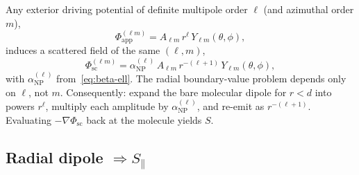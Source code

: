 \documentclass[11pt,a4paper]{article}
\theoremstyle{definition}
\newcommand{\alphanp}{\alpha_{\text{NP}}}
\begin{document}
\noindent
Any exterior driving potential of definite multipole order $\ell$ (and azimuthal order $m$),
\begin{equation}
  \Phi_{\mathrm{app}}^{(\ell m)}
  =
  A_{\ell m}\, r^{\ell}\, Y_{\ell m}(\theta,\phi),
\end{equation}
induces a scattered field of the same $(\ell,m)$,
\begin{equation}
  \Phi_{\mathrm{sc}}^{(\ell m)}
  =
  \alphanp^{(\ell)}\, A_{\ell m}\, r^{-(\ell+1)}\, Y_{\ell m}(\theta,\phi),
  \label{eq:sphere-multipole-response}
\end{equation}
with $\alphanp^{(\ell)}$ from~\eqref{eq:beta-ell}. The radial boundary-value problem depends only on $\ell$, not $m$. Consequently: expand the bare molecular dipole for $r<d$ into powers $r^{\ell}$, multiply each amplitude by $\alphanp^{(\ell)}$, and re-emit as $r^{-(\ell+1)}$. Evaluating $-\nabla\Phi_{\mathrm{sc}}$ back at the molecule yields $S$.

\subsection{Radial dipole $\Rightarrow S_\parallel$}
\end{document}
